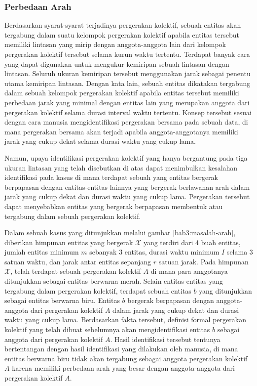 \documentclass[a4paper,twoside]{article}
\begin{document}
\subsubsection{Perbedaan Arah}

Berdasarkan syarat-syarat terjadinya pergerakan kolektif, sebuah entitas akan tergabung dalam suatu kelompok pergerakan kolektif apabila entitas tersebut memiliki lintasan yang mirip dengan anggota-anggota lain dari kelompok pergerakan kolektif tersebut selama kurun waktu tertentu. Terdapat banyak cara yang dapat digunakan untuk mengukur kemiripan sebuah lintasan dengan lintasan. Seluruh ukuran kemiripan tersebut menggunakan jarak sebagai penentu utama kemiripan lintasan. Dengan kata lain, sebuah entitas dikatakan tergabung dalam sebuah kelompok pergerakan kolektif apabila entitas tersebut memiliki perbedaan jarak yang minimal dengan entitas lain yang merupakan anggota dari pergerakan kolektif selama durasi interval waktu tertentu. Konsep tersebut sesuai dengan cara manusia mengidentifikasi pergerakan bersama pada sebuah data, di mana pergerakan bersama akan terjadi apabila anggota-anggotanya memiliki jarak yang cukup dekat selama durasi waktu yang cukup lama.

Namun, upaya identifikasi pergerakan kolektif yang hanya bergantung pada tiga ukuran lintasan yang telah disebutkan di atas dapat menimbulkan kesalahan identifikasi pada kasus di mana terdapat sebuah yang entitas bergerak berpapasan dengan entitas-entitas lainnya yang bergerak berlawanan arah dalam jarak yang cukup dekat dan durasi waktu yang cukup lama. Pergerakan tersebut dapat menyebabkan entitas yang bergerak berpapasan membentuk atau tergabung dalam sebuah pergerakan kolektif.
    
Dalam sebuah kasus yang ditunjukkan melalui gambar \ref{bab3:masalah-arah}, diberikan himpunan entitas yang bergerak $\mathcal{X}$ yang terdiri dari 4 buah entitas, jumlah entitas minimum $m$ sebanyak $3$ entitas, durasi waktu minimum $I$ selama $3$ satuan waktu, dan jarak antar entitas sepanjang $r$ satuan jarak. Pada himpunan $\mathcal{X}$, telah terdapat sebuah pergerakan kolektif $A$ di mana para anggotanya ditunjukkan sebagai entitas berwarna merah. Selain entitas-entitas yang tergabung dalam pergerakan kolektif, terdapat sebuah entitas $b$ yang ditunjukkan sebagai entitas berwarna biru. Entitas $b$ bergerak berpapasan dengan anggota-anggota dari pergerakan kolektif $A$ dalam jarak yang cukup dekat dan durasi waktu yang cukup lama. Berdasarkan fakta tersebut, definisi formal pergerakan kolektif yang telah dibuat sebelumnya akan mengidentifikasi entitas $b$ sebagai anggota dari pergerakan kolektif $A$. Hasil identifikasi tersebut tentunya bertentangan dengan hasil identifikasi yang dilakukan oleh manusia, di mana entitas berwarna biru tidak akan tergabung sebagai anggota pergerakan kolektif $A$ karena memiliki perbedaan arah yang besar dengan anggota-anggota dari pergerakan kolektif $A$.
\end{document}
